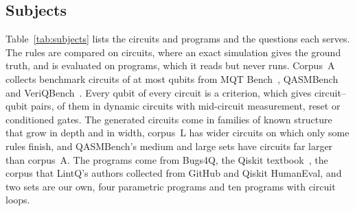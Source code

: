 \subsection{Subjects}
Table~\ref{tab:subjects} lists the circuits and programs and the questions each serves. The rules are compared on
circuits, where an exact simulation gives the ground truth, and \tool{} is evaluated on programs, which it reads but
never runs. Corpus~A collects benchmark circuits of at most \numSizeAMaxQubits{} qubits from MQT
Bench~\cite{quetschlich2023mqt}, QASMBench~\cite{li2023qasmbench} and VeriQBench~\cite{chen2022veriqbench}. Every
qubit of every circuit is a criterion, which gives \numNPairs{} circuit--qubit pairs, \numNDynamicPairs{} of them in
dynamic circuits with mid-circuit measurement, reset or conditioned gates. The generated circuits come in families of known
structure that grow in depth and in width, corpus~L has wider circuits on which only some rules finish, and
QASMBench's medium and large sets have circuits far larger than corpus~A. The programs come from Bugs4Q, the Qiskit
textbook~\cite{qiskittextbook}, the corpus that LintQ's authors collected from GitHub and Qiskit HumanEval, and two
sets are our own, four parametric programs and ten programs with circuit loops.

